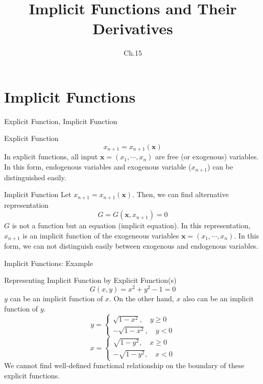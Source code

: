 \documentclass[final]{beamer}
\author[조남운]{\mail}
\title{Implicit Functions and Their Derivatives}
\subtitle{Ch.15}
\newcommand{\bd}{\mathbf}
\begin{document}
	
\maketitle


\section{Implicit Functions} %
\label{sec:implicit_functions}
\begin{frame}[t]{Explicit Function, Implicit Function}
	\begin{block}
		{Explicit Function}
		\[
			x_{n+1}=x_{n+1}(\bd{x})
		\]
		In explicit functions, all input $\bd{x}=(x_1,\cdots,x_n)$ are free (or exogenous) variables. In this form, endogenous variables and exogenous variable ($x_{n+1}$) can be distinguished easily.
	\end{block}
	\begin{block}
		{Implicit Function}
		Let $x_{n+1}=x_{n+1}(\bd x)$. Then, we can find alternative representation 
		\[
			G=G(\bd{x},x_{n+1})=0
		\]
		$G$ is not a function but an equation (implicit equation). In this representation, $x_{n+1}$ is an implicit function of the exogeneous variables $\bd{x}=(x_1,\cdots,x_n)$. In this form, we can not distinguish easily between exogenous and endogenous variables. 
	\end{block}
\end{frame}

\begin{frame}[t]{Implicit Functions: Example}
	\begin{block}
		{Representing Implicit Function by Explicit Function(s)}
		\[
			G(x,y) = x^2 + y^2 - 1 = 0
		\]
		$y$ can be an implicit function of $x$. On the other hand, $x$ also can be an implicit function of $y$. 
		\[
			y=\begin{cases}
				\sqrt{1-x^2},\quad y\ge 0\\
				-\sqrt{1-x^2},\quad y< 0
			\end{cases}
		\]
		\[
			x=\begin{cases}
				\sqrt{1-y^2},\quad x\ge 0\\
				-\sqrt{1-y^2},\quad x< 0
			\end{cases}
		\]
		We cannot find well-defined functional relationship on the boundary of these explicit functions.
	\end{block}
\end{frame}
\end{document}
